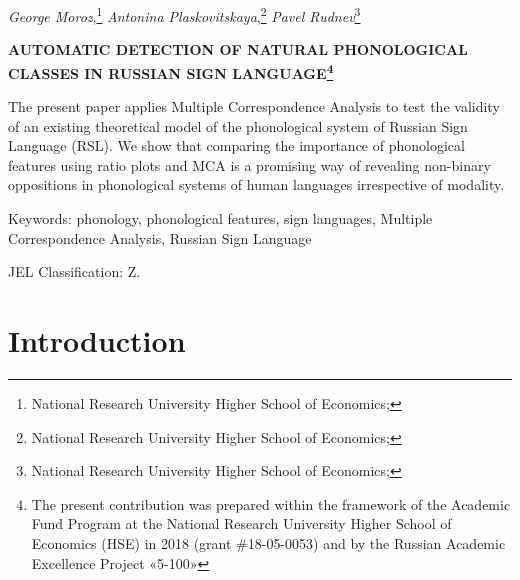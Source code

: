 \thispagestyle{empty}

\begin{centering}
\emph{George Moroz},\footnote{National Research University Higher School of Economics; } \emph{Antonina Plaskovitskaya},\footnote{National Research University Higher School of Economics; } \emph{Pavel Rudnev}\footnote{National Research University Higher School of Economics; }

\vspace*{2em}

\large\bfseries
AUTOMATIC DETECTION OF NATURAL PHONOLOGICAL CLASSES  IN RUSSIAN SIGN LANGUAGE\footnote{The present contribution was prepared within the framework of the Academic Fund Program at the National Research University Higher School of Economics (HSE) in 2018 (grant \#18-05-0053) and by the Russian Academic Excellence Project «5-100»}
\end{centering}
\vspace*{2em}

The present paper applies Multiple Correspondence Analysis to test the
validity of an existing theoretical model of the phonological system of
Russian Sign Language (RSL). We show that comparing the importance of
phonological features using ratio plots and MCA is a promising way of
revealing non-binary oppositions in phonological systems of human
languages irrespective of modality.

\vspace*{2em}

Keywords: phonology, phonological features, sign languages, Multiple
Correspondence Analysis, Russian Sign Language

JEL Classification: Z.

\newpage

\hypertarget{introduction}{%
\section{Introduction}\label{introduction}}

